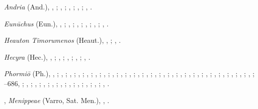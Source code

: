 \begin{autindex}
  \subitem \emph{Andria} (And.),
    , ;
    , ;
    , ;
    , ;
    , .

  \subitem \emph{Eunūchus} (Eun.),
    , ;
    , ;
    , ;
    , ;
    , ;
    , .

  \subitem \emph{Heauton Timorumenos} (Heaut.),
    , ;
    , .

  \subitem \emph{Hecyra} (Hec.),
    , ;
    , ;
    , ;
    , ;
    , .

  \subitem \emph{Phormiō} (Ph.),
    , ;
    , ;
    , ;
    , ;
    , ;
    , ;
    , ;
    , ;
    , ;
    , ;
    , ;
    , ;
    , ;
    , ;
    , ;
    , ;
    , ;
    , ;
    , ;
    , ;
    , ;
    , ;
    , ;
    , ;
    –686, ;
    , ;
    , ;
    , ;
    , ;
    , ;
    , ;
    , ;
    , ;
    , ;
    , .

\indexspace

,
  \subitem \emph{Menippeae} (Varro, Sat. Men.),
    , .

\indexspace


\end{autindex}
